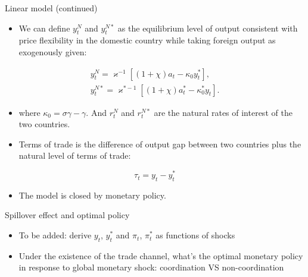 \documentclass[10pt]{beamer}
\begin{document}
\begin{frame}{Linear model (continued)}

\begin{itemize}
    \item We can define $y_{t}^{N}$ and $y_{t}^{N *}$ as the equilibrium level of output consistent with price flexibility in the domestic country while taking foreign output as exogenously given:
\end{itemize}

$$
\begin{gathered}
y_{t}^{N}=\varkappa^{-1}\left[(1+\chi) a_{t}-\kappa_{0} y_{t}^{*}\right], \\
y_{t}^{N *}=\varkappa^{*-1}\left[(1+\chi) a_{t}^{*}-\kappa_{0}^{*} y_{t}\right] .
\end{gathered}
$$



\begin{itemize}
    \item where $\kappa_{0}=\sigma \gamma-\gamma$. And $r_{t}^{N}$ and $r_{t}^{N *}$ are the natural rates of interest of the two countries.
\end{itemize}

\begin{itemize}
    \item Terms of trade is the difference of output gap between two countries plus the natural level of terms of trade:
\end{itemize}


$$
\tau_{t}=y_{t}-y_{t}^{*}
$$
\begin{itemize}
    \item The model is closed by monetary policy.
\end{itemize}

\end{frame}


\begin{frame}{Spillover effect and optimal policy}

\begin{itemize}
    \item To be added: derive $y_t$, $y_t^*$ and $\pi_t$, $\pi_t^*$ as functions of shocks
    \item Under the existence of the trade channel, what's the optimal monetary policy in response to global monetary shock: coordination VS non-coordination
\end{itemize}

\end{frame}
\end{document}
